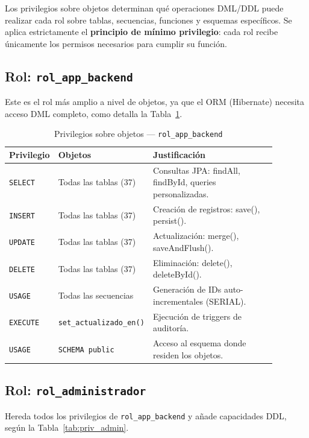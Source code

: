\documentclass[conference, onecolumn]{IEEEtran}
\begin{document}
Los privilegios sobre objetos determinan qué operaciones DML/DDL puede realizar cada rol sobre tablas, secuencias, funciones y esquemas específicos. Se aplica estrictamente el \textbf{principio de mínimo privilegio}: cada rol recibe únicamente los permisos necesarios para cumplir su función.

\subsection{Rol: \texttt{rol\_app\_backend}}

Este es el rol más amplio a nivel de objetos, ya que el ORM (Hibernate) necesita acceso DML completo, como detalla la Tabla~\ref{tab:priv_app}.

\begin{table}[H]
\centering
\caption{Privilegios sobre objetos — \texttt{rol\_app\_backend}}
\label{tab:priv_app}
\scriptsize
\begin{tabular}{>{\raggedright\arraybackslash}p{0.16\linewidth} >{\raggedright\arraybackslash}p{0.26\linewidth} >{\raggedright\arraybackslash}p{0.46\linewidth}}
\toprule
\textbf{Privilegio} & \textbf{Objetos} & \textbf{Justificación} \\
\midrule
\texttt{SELECT} & Todas las tablas (37) & Consultas JPA: findAll, findById, queries personalizadas. \\
\texttt{INSERT} & Todas las tablas (37) & Creación de registros: save(), persist(). \\
\texttt{UPDATE} & Todas las tablas (37) & Actualización: merge(), saveAndFlush(). \\
\texttt{DELETE} & Todas las tablas (37) & Eliminación: delete(), deleteById(). \\
\texttt{USAGE} & Todas las secuencias & Generación de IDs auto-incrementales (SERIAL). \\
\texttt{EXECUTE} & \texttt{set\_actualizado\_en()} & Ejecución de triggers de auditoría. \\
\texttt{USAGE} & \texttt{SCHEMA public} & Acceso al esquema donde residen los objetos. \\
\bottomrule
\end{tabular}
\end{table}

\subsection{Rol: \texttt{rol\_administrador}}

Hereda todos los privilegios de \texttt{rol\_app\_backend} y añade capacidades DDL, según la Tabla~\ref{tab:priv_admin}.
\end{document}
